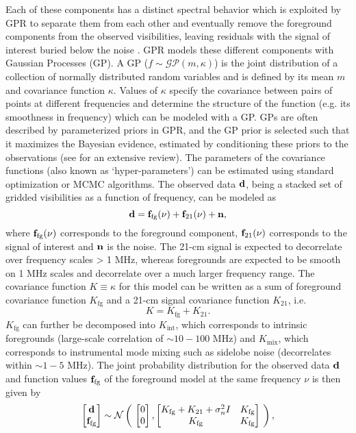 \documentclass[fleqn,usenatbib]{mnras}
\begin{document}
Each of these components has a distinct spectral behavior which is exploited by GPR to separate them from each other and eventually remove the foreground components from the observed visibilities, leaving residuals with the signal of interest buried below the noise \citep{mertens2018}. GPR models these different components with Gaussian Processes (GP). A GP ($f \sim \mathcal{GP} (m,\kappa)$) is the joint distribution of a collection of normally distributed random variables and is defined by its mean $m$ and covariance function $\kappa$. Values of $\kappa$ specify the covariance between pairs of points at different frequencies and determine the structure of the function (e.g. its smoothness in frequency) which can be modeled with a GP. GPs are often described by parameterized priors in GPR, and the GP prior is selected such that it maximizes the Bayesian evidence, estimated by conditioning these priors to the observations (see \citealt{rasmussen2005} for an extensive review). The parameters of the covariance functions (also known as `hyper-parameters') can be estimated using standard optimization or MCMC algorithms. The observed data ${\bf d}$, being a stacked set of gridded visibilities as a function of frequency, can be modeled as
\begin{equation}
{\bf d} = {\bf f}_{\text{fg}}(\nu) + {\bf f}_{21}(\nu) + {\bf n},
\end{equation}
where ${\bf f}_{\text{fg}}(\nu)$ corresponds to the foreground component, ${\bf f}_{21}(\nu)$ corresponds to the signal of interest and ${\bf n}$ is the noise. The 21-cm signal is expected to decorrelate over frequency scales > 1 MHz, whereas foregrounds are expected to be smooth on 1 MHz scales and decorrelate over a much larger frequency range. The covariance function $K\equiv \kappa$ for this model can be written as a sum of foreground covariance function $K_{\text{fg}}$ and a 21-cm signal covariance function $K_{21}$, i.e.
\begin{equation}
K = K_{\text{fg}} + K_{21}.
\end{equation}
$K_{\text{fg}}$ can further be decomposed into $K_{\text{int}}$, which corresponds to intrinsic foregrounds (large-scale correlation of $\sim 10 - 100$ MHz) and $K_{\text{mix}}$, which corresponds to instrumental mode mixing such as sidelobe noise (decorrelates within $\sim 1-5$ MHz). The joint probability distribution for the observed data ${\bf d}$ and function values ${\bf f}_{\text{fg}}$ of the foreground model at the same frequency $\nu$ is then given by
\begin{equation}
\begin{bmatrix} {\bf d} \\ {\bf f}_{\text{fg}} \end{bmatrix} \sim \mathcal{N} \left( \ \begin{bmatrix} 0 \\ 0 \end{bmatrix} , \begin{bmatrix} K_{\text{fg}} + K_{21} + \sigma_n^2 I & K_{\text{fg}} \\ K_{\text{fg}} & K_{\text{fg}} \end{bmatrix} \ \right),
\end{equation}
\end{document}

